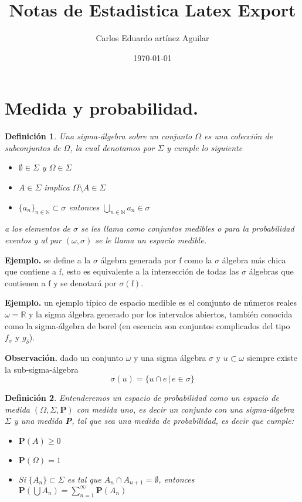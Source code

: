 \documentclass[letterpaper]{article}
\author{Carlos Eduardo artínez Aguilar}
\date{\today}
\title{Notas de Estadistica Latex Export}
\newtheorem{def.}{Definici\'on}[section]
\newcommand{\nat}{\ensuremath{ \mathbb N }}
\newcommand{\eje}{{\newline \noindent \sc \textbf{Ejemplo. }}}
\newcommand{\obs}{{\newline \noindent \sc \textbf{Observación. }}}
\newcommand{\re}{\ensuremath{\mathbb R }}
\begin{document}
\maketitle
\tableofcontents

\section{Medida y probabilidad.}
\label{sec:org8a03ec1}

\begin{def.}
Una \emph{sigma-álgebra} sobre un conjunto \(\Omega\) es una colección de subconjuntos de \(\Omega\), la cual denotamos por \(\Sigma\) y cumple lo siguiente
\begin{itemize}
\item \(\emptyset\in\Sigma\) y \(\Omega\in\Sigma\)
\item \(A\in\Sigma\) implica \(\Omega\setminus A\in\Sigma\)
\item \(\{a_n\}_{n\in\nat}\subset\sigma\) entonces \(\bigcup_{n\in\nat} a_n\in\sigma\)
\end{itemize}
a los elementos de \(\sigma\) se les llama como \emph{conjuntos medibles} o para la probabilidad \emph{eventos} y al par \((\omega,\sigma)\) se le llama un espacio medible.
\end{def.}

\eje se define a la \(\sigma\) álgebra generada por \(\mathrm{f}\) como la \(\sigma\) álgebra más chica que contiene a \(\mathrm{f}\), esto es equivalente a la intersección de todas las \(\sigma\) álgebras que contienen a \(\mathrm{f}\) y se denotará por \(\sigma(\mathrm{f})\).

\eje un ejemplo típico de espacio medible es el comjunto de números reales \(\omega=\re\) y la sigma álgebra generado por los intervalos abiertos, también conocida como la sigma-álgebra de borel (en escencia son conjuntos complicados del tipo \(f_{\sigma}\) y \(g_{\delta}\)).

\obs dado un conjunto \(\omega\) y una sigma álgebra \(\sigma\) y \(u\subset\omega\) siempre existe la sub-sigma-álgebra
\[
    \sigma(u)=\{u\cap e\,|\,e\in\sigma\}
\]

\begin{def.}
\noindent Entenderemos un \emph{espacio de probabilidad} como un espacio de medida \((\Omega,\Sigma,\textbf{P})\) con medida uno, es decir un conjunto con una \emph{sigma-álgebra} \(\Sigma\) y una medida \textbf{P}, tal que sea una medida de probabilidad, es decir que cumple:

\begin{itemize}
\item \(\textbf{P}(A)\geq 0\)
\item \(\textbf{P}(\Omega)=1\)
\item Si \(\{A_n\}\subset\Sigma\) es tal que \(A_n\cap A_{n+1}=\emptyset\), entonces \(\textbf{P}(\bigcup A_n)=\sum_{n=1}^{\infty} \textbf{P}(A_n)\)
\end{itemize}
\end{def.}
\end{document}
